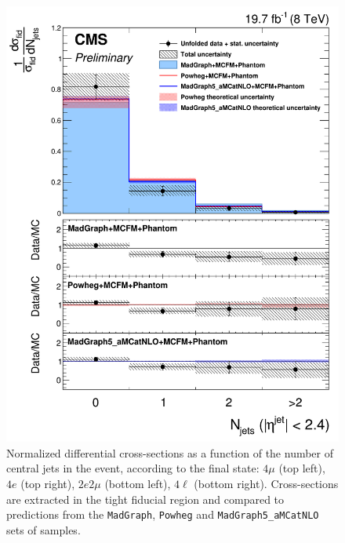 \begin{figure}[hbtp]
\begin{center}
    \includegraphics[width=\cmsFigWidth]{Figures/DiffCrossSecZZTo4lCentralJets_Unfolded_fr_MadGraph_norm.png}       
    \caption{\footnotesize{Normalized differential cross-sections as a function of the number of central jets in the event, according to the final state: $4\mu$ (top left), $4e$ (top right), $2e2\mu$  (bottom left),  $4\ell$ (bottom right). Cross-sections are extracted in the tight fiducial region and compared to predictions from the \texttt{MadGraph}, \texttt{Powheg}  and \texttt{MadGraph5\_aMCatNLO} sets of samples.}}
    \label{fig:diff_xs_centraljets}
  \end{center}
\end{figure}

